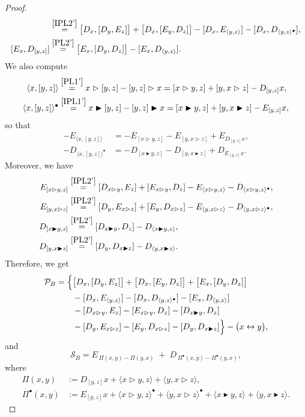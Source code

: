 \documentclass[10pt]{article}
\theoremstyle{definition}
\newcommand{\wt}{\vartriangleright}
\newcommand{\bt}{\blacktriangleright}
\newcommand{\ab}[2]{\langle #1,#2\rangle}
\newcommand{\abd}[2]{\langle #1,#2\rangle^{\bullet}}
\begin{document}
\begin{proof}
\begin{align*}
[D_x,E_{[y,z]}] &\overset{\eqref{IPL2'}}{=}\bigl[D_x,[D_y,E_z]\bigr]+\bigl[D_x,[E_y,D_z]\bigr]-[D_x,E_{\ab{y}{z}}]-[D_x,D_{\abd{y}{z}}],\\
  [E_x,D_{[y,z]}] &\overset{\eqref{PL2'}}{=} \bigl[E_x,[D_y,D_z]\bigr]-[E_x,D_{\ab{y}{z}}].
\end{align*}
We also compute 
\begin{align*}
  \ab{x}{[y,z]}  &\overset{\eqref{PL1'}}{=} x\wt[y,z]-[y,z]\wt x=[x\wt y,z]+[y,x\wt z]-D_{[y,z]}x,\\
  \abd{x}{[y,z]} &\overset{\eqref{IPL1'}}{=} x\bt[y,z]-[y,z]\bt x=[x\bt y,z]+[y,x\bt z]-E_{[y,z]}x,
\end{align*}
so that
\begin{align*}
  -E_{\ab{x}{[y,z]}}  &= -E_{[x\wt y,z]}-E_{[y,x\wt z]}+E_{D_{[y,z]}x},\\
  -D_{\abd{x}{[y,z]}} &= -D_{[x\bt y,z]}-D_{[y,x\bt z]}+D_{E_{[y,z]}x}.
\end{align*}
Moreover, we have
\begin{align*}
E_{[x\wt y,z]} &\overset{\eqref{IPL2'}}{=} [D_{x\wt y},E_z]+[E_{x\wt y},D_z]-E_{\ab{x\wt y}{z}}-D_{\abd{x\wt y}{z}},\\
E_{[y,x\wt z]} &\overset{\eqref{IPL2'}}{=}[D_y,E_{x\wt z}]+[E_y,D_{x\wt z}]-E_{\ab{y}{x\wt z}}-D_{\abd{y}{x\wt z}},\\
D_{[x\bt y,z]} &\overset{\eqref{PL2'}}{=} [D_{x\bt y},D_z]-D_{\ab{x\bt y}{z}},\\
D_{[y,x\bt z]} &\overset{\eqref{PL2'}}{=} [D_y,D_{x\bt z}]-D_{\ab{y}{x\bt z}} .
\end{align*}
Therefore, we get
\begin{align*}
\mathcal P_B&= \Bigl\{\bigl[D_x,[D_y,E_z]\bigr]+\bigl[D_x,[E_y,D_z]\bigr]+\bigl[E_x,[D_y,D_z]\bigr]\\
&\qquad -[D_x,E_{\ab{y}{z}}]-[D_x,D_{\abd{y}{z}}]-[E_x,D_{\ab{y}{z}}]\\
&\qquad -[D_{x\wt y},E_z]-[E_{x\wt y},D_z]-[D_{x\bt y},D_z]\\
  &\qquad -[D_y,E_{x\wt z}]-[E_y,D_{x\wt z}]-[D_y,D_{x\bt z}]
     \Bigr\}-\bigl(x\leftrightarrow y\bigr),
\end{align*}
and
\[
  \mathcal S_B
  = E_{\,\Pi(x,y)-\Pi(y,x)}\;+\;D_{\,\Pi^{\bullet}(x,y)-\Pi^{\bullet}(y,x)},
\]
where
\begin{align*}
\Pi(x,y)&:= D_{[y,z]}x+\ab{x\wt y}{z}+\ab{y}{x\wt z},\\
\Pi^{\bullet}(x,y)&:= E_{[y,z]}x+\abd{x\wt y}{z}+\abd{y}{x\wt z}+\ab{x\bt y}{z}+\ab{y}{x\bt z}.

\end{align*}
\end{proof}
\end{document}
